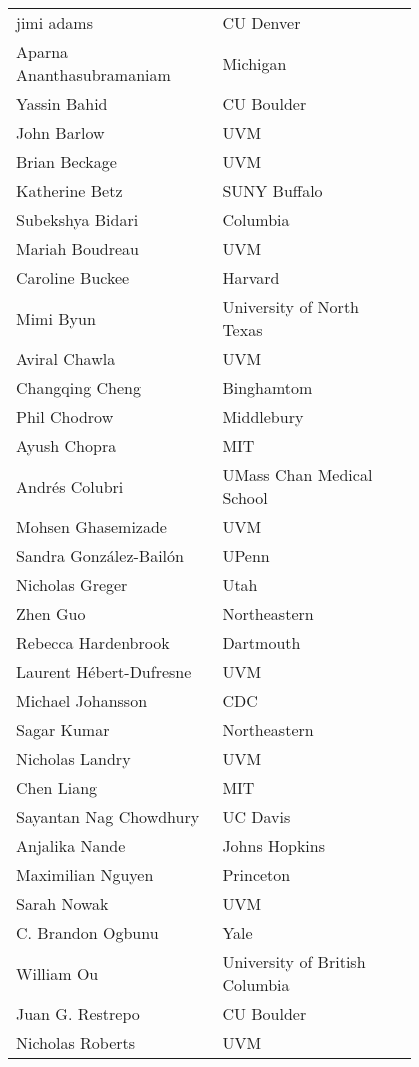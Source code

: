 \begin{center}
    \begin{longtable}{p{0.4\linewidth} p{0.4\linewidth} }
    jimi adams & CU Denver \\ 
    Aparna Ananthasubramaniam & Michigan \\ 
    Yassin Bahid & CU Boulder \\ 
    John Barlow & UVM \\ 
    Brian Beckage & UVM \\ 
    Katherine Betz & SUNY Buffalo \\ 
    Subekshya Bidari & Columbia \\ 
    Mariah Boudreau & UVM \\ 
    Caroline Buckee & Harvard \\ 
    Mimi Byun & University of North Texas \\ 
    Aviral Chawla & UVM \\ 
    Changqing Cheng & Binghamtom \\ 
    Phil Chodrow & Middlebury \\ 
    Ayush Chopra & MIT \\ 
    Andrés Colubri & UMass Chan Medical School \\ 
    Mohsen Ghasemizade & UVM \\ 
    Sandra González-Bailón & UPenn \\ 
    Nicholas Greger & Utah \\ 
    Zhen Guo & Northeastern \\ 
    Rebecca Hardenbrook & Dartmouth \\ 
    Laurent Hébert-Dufresne & UVM \\ 
    Michael Johansson & CDC \\ 
    Sagar Kumar & Northeastern \\ 
    Nicholas Landry & UVM \\ 
    Chen Liang & MIT \\ 
    Sayantan Nag Chowdhury & UC Davis \\ 
    Anjalika Nande & Johns Hopkins \\ 
    Maximilian Nguyen & Princeton \\ 
    Sarah Nowak & UVM \\ 
    C. Brandon Ogbunu & Yale \\ 
    William Ou & University of British Columbia \\ 
    Juan G. Restrepo & CU Boulder \\ 
    Nicholas Roberts & UVM \\ 

\end{longtable}
\end{center}
